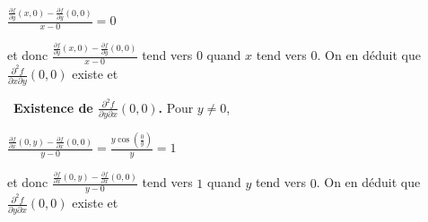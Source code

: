{\begin{enumerate}
{\begin{center}
$\frac{\frac{\partial f}{\partial y}(x,0)-\frac{\partial f}{\partial y}(0,0)}{x-0}=0$
\end{center}
et donc $\frac{\frac{\partial f}{\partial y}(x,0)-\frac{\partial f}{\partial y}(0,0)}{x-0}$ tend vers $0$ quand $x$ tend vers $0$. On en déduit que $\frac{\partial^2f}{\partial x\partial y}(0,0)$ existe et

\begin{center}
\end{center}
\textbullet~\textbf{Existence de $\frac{\partial^2f}{\partial y\partial x}(0,0)$.} Pour $y\neq0$,

\begin{center}
$\frac{\frac{\partial f}{\partial x}(0,y)-\frac{\partial f}{\partial x}(0,0)}{y-0}=\frac{y\cos\left(\frac{0}{y}\right)}{y}=1$
\end{center}
et donc $\frac{\frac{\partial f}{\partial x}(0,y)-\frac{\partial f}{\partial x}(0,0)}{y-0}$ tend vers $1$ quand $y$ tend vers $0$. On en déduit que $\frac{\partial^2f}{\partial y\partial x}(0,0)$ existe et

\begin{center}
\end{center}}
\end{enumerate}
}